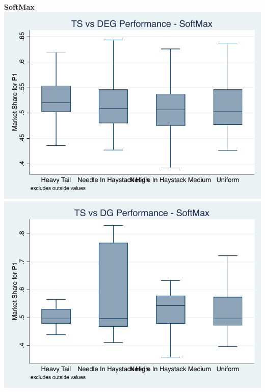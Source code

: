 \documentclass[11pt,letterpaper]{article}
\begin{document}
\pagebreak
\textbf{SoftMax} \\
\includegraphics[scale=0.75]{sm_ts_deg_prior} \\
\includegraphics[scale=0.75]{sm_ts_dg_prior} \\
\end{document}
